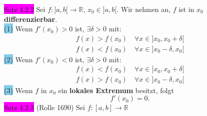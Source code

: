 \documentclass[landscape, 10pt]{article}
\newcommand{\R}{\mathbb{R}}
\begin{document}
\begin{multicols}{3}
              \colorbox{magenta}{Satz 4.2.2} 
                     Sei \textcolor{NavyBlue}{
                     $f:]a,b[\longrightarrow\R$},
                     \textcolor{NavyBlue}{$x_0\in]a,b[$}. 
                     Wir nehmen an, \textcolor{NavyBlue}{$f$} 
                     ist in 
                     \textcolor{NavyBlue}{$x_0$} 
                     \textbf{differenzierbar}.\\
                     \colorbox{SkyBlue}{(1)} 
                            Wenn \textcolor{NavyBlue}{
                            $f'(x_0)>0$} 
                            ist, \textcolor{NavyBlue}{
                            $\exists\delta>0$} mit: 
                            \begin{align*}
                                   f(x)>f(x_0)\quad
                                   \forall x
                                   \in]x_0,x_0+\delta[ \\
                                   f(x)<f(x_0)\quad
                                   \forall x
                                   \in]x_0-\delta,x_0[
                            \end{align*}
                     \colorbox{SkyBlue}{(2)} 
                            Wenn 
                            \textcolor{NavyBlue}{$f'(x_0)<0$} 
                            ist, 
                            \textcolor{NavyBlue}{
                            $\exists\delta>0$} mit: 
                            \begin{align*}
                                   f(x)<f(x_0)\quad
                                   \forall x
                                   \in]x_0,x_0+\delta[\\
                                   f(x)>f(x_0)\quad
                                   \forall x
                                   \in]x_0-\delta,x_0[
                            \end{align*}
                     \colorbox{SkyBlue}{(3)} 
                            Wenn \textcolor{NavyBlue}{$f$} in 
                            \textcolor{NavyBlue}{$x_0$} ein 
                            \textbf{lokales Extremum} 
                            besitzt, folgt 
                            \begin{equation*}
                                   f'(x_0)=0.
                            \end{equation*}
              \colorbox{magenta}{Satz 4.2.3} 
              (Rolle 1690) 
                     Sei \textcolor{NavyBlue}{
                     $f:[a,b]\longrightarrow\R$}

\end{multicols}
\end{document}
